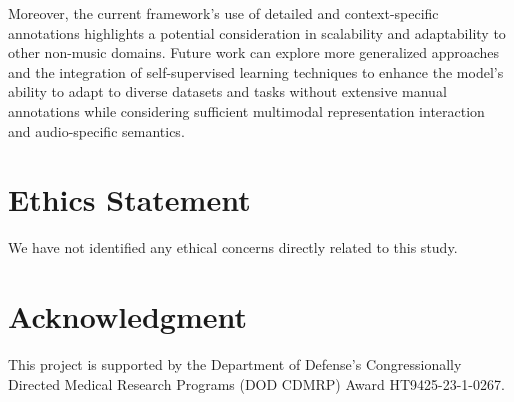 \documentclass[11pt]{article}
\begin{document}
Moreover, the current framework's use of detailed and context-specific annotations highlights a potential consideration in scalability and adaptability to other non-music domains. Future work can explore more generalized approaches and the integration of self-supervised learning techniques to enhance the model's ability to adapt to diverse datasets and tasks without extensive manual annotations while considering sufficient multimodal representation interaction and audio-specific semantics.

\section*{Ethics Statement}
We have not identified any ethical concerns directly related to this study.

\section*{Acknowledgment}
This project is supported by the Department of Defense’s Congressionally Directed Medical Research Programs (DOD CDMRP) Award HT9425-23-1-0267.


\end{document}
